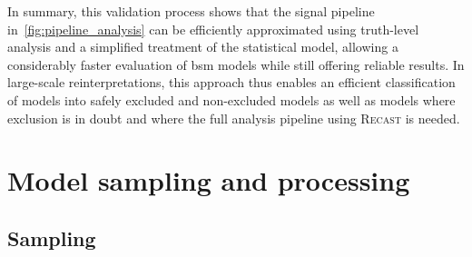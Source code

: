 In summary, this validation process shows that the signal pipeline in~\cref{fig:pipeline_analysis} can be efficiently approximated using truth-level analysis and a simplified treatment of the statistical model, allowing a considerably faster evaluation of \gls{bsm} models while still offering reliable results. In large-scale reinterpretations, this approach thus enables an efficient classification of models into safely excluded and non-excluded models as well as models where exclusion is in doubt and where the full analysis pipeline using \textsc{Recast} is needed.

\section{Model sampling and processing}\label{sec:pmssm_sampling}


\subsection{Sampling}

